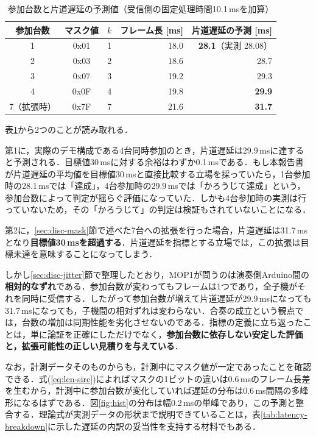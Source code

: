 \documentclass[uplatex,dvipdfmx]{jlreq}
\begin{document}
\begin{table}[tb]
\caption{参加台数と片道遅延の予測値（受信側の固定処理時間10.1\,msを加算）}
\label{tab:scale}
\begin{center}
\small
\begin{tabular}{cccrr}
\hline
参加台数 & マスク値 & $k$ & フレーム長 [ms] & 片道遅延の予測 [ms] \\
\hline
1 & 0x01 & 1 & 18.0 & \textbf{28.1}（実測 28.08） \\
2 & 0x03 & 2 & 18.6 & 28.7 \\
3 & 0x07 & 3 & 19.2 & 29.3 \\
4 & 0x0F & 4 & 19.8 & \textbf{29.9} \\
7（拡張時） & 0x7F & 7 & 21.6 & \textbf{31.7} \\
\hline
\end{tabular}
\end{center}
\end{table}

表\ref{tab:scale}から2つのことが読み取れる．

第1に，実際のデモ構成である4台同時参加のとき，片道遅延は29.9\,msに達すると予測される．目標値30\,msに対する余裕はわずか0.1\,msである．もし本報告書が片道遅延の平均値を目標値30\,msと直接比較する立場を採っていたら，1台参加時の28.1\,msでは「達成」，4台参加時の29.9\,msでは「かろうじて達成」という，参加台数によって判定が揺らぐ評価になっていた．しかも4台参加時の実測は行っていないため，その「かろうじて」の判定は検証もされていないことになる．

第2に，\ref{sec:disc-mask}節で述べた7台への拡張を行った場合，片道遅延は31.7\,msとなり\textbf{目標値30\,msを超過する}．片道遅延を指標とする立場では，この拡張は目標未達を意味することになってしまう．

しかし\ref{sec:disc-jitter}節で整理したとおり，MOP1が問うのは演奏側Arduino間の\textbf{相対的なずれ}である．参加台数が変わってもフレームは1つであり，全子機がそれを同時に受信する．したがって参加台数が増えて片道遅延が29.9\,msになっても31.7\,msになっても，子機間の相対ずれは変わらない．合奏の成立という観点では，台数の増加は同期性能を劣化させないのである．指標の定義に立ち返ったことは，単に論証を正確にしただけでなく，\textbf{参加台数に依存しない安定した評価と，拡張可能性の正しい見積りを与えている}．

なお，計測データそのものからも，計測中にマスク値が一定であったことを確認できる．式(\ref{eq:len-sirc})によればマスクの1ビットの違いは0.6\,msのフレーム長差を生むから，計測中に参加台数が変化していれば遅延の分布は0.6\,ms間隔の多峰形になるはずである．図\ref{fig:hist}の分布は幅0.2\,msの単峰であり，この予測と整合する．理論式が実測データの形状まで説明できていることは，表\ref{tab:latency-breakdown}に示した遅延の内訳の妥当性を支持する材料でもある．
\end{document}
